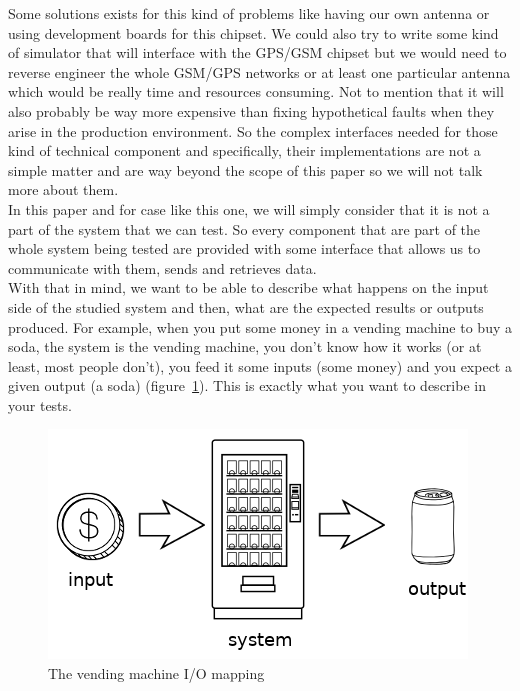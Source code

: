 \documentclass[12pt]{article}
\theoremstyle{definition}
\theoremstyle{definition}
\begin{document}
Some solutions exists for this kind of problems like having our own antenna or using development boards for this chipset. We could also try to write some kind of simulator that will interface with the GPS/GSM chipset but we would need to reverse engineer the whole GSM/GPS networks or at least one particular antenna which would be really time and resources consuming. Not to mention that it will also probably be way more expensive than fixing hypothetical faults when they arise in the production environment. So the complex interfaces needed for those kind of technical component and specifically, their implementations are not a simple matter and are way beyond the scope of this paper so we will not talk more about them. \\

In this paper and for case like this one, we will simply consider that it is not a part of the system that we can test. So every component that are part of the whole system being tested are provided with some interface that allows us to communicate with them, sends and retrieves data.\\

With that in mind, we want to be able to describe what happens on the input side of the studied system and then, what are the expected results or outputs produced. For example, when you put some money in a vending machine to buy a soda, the system is the vending machine, you don't know how it works (or at least, most people don't), you feed it some inputs (some money) and you expect a given output (a soda) (figure~\ref{vm-io}). This is exactly what you want to describe in your tests.\\

\begin{figure}
    \centering
    \includegraphics[scale=0.8]{vending-io.png}
    \caption{The vending machine I/O mapping}
    \label{vm-io}
\end{figure}
\end{document}
